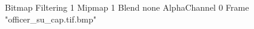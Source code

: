 {Bitmap
	{Filtering 1}
	{Mipmap 1}
	{Blend none}
	{AlphaChannel 0}
	{Frame "officer_su_cap.tif.bmp"}
}
